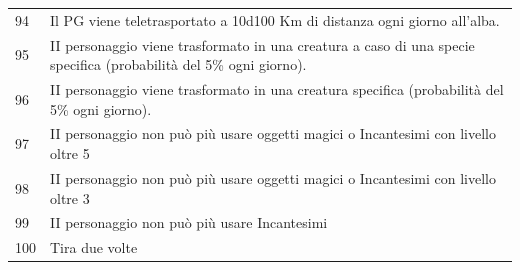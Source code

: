 {\begin{tabularx}{0.95\textwidth}{lX}
		94      & Il PG viene teletrasportato a 10d100 Km di distanza ogni giorno all'alba.\\
		95      & II personaggio viene trasformato in una creatura a caso di una specie specifica (probabilità del 5\% ogni giorno).\\
		96      & II personaggio viene trasformato in una creatura specifica (probabilità del 5\% ogni giorno).\\
		97      & II personaggio non può più usare oggetti magici o Incantesimi con livello oltre 5\\
		98      & II personaggio non può più usare oggetti magici o Incantesimi con livello oltre 3\\
		99      & II personaggio non può più usare Incantesimi\\
		100     & Tira due volte\\
\end{tabularx}}
